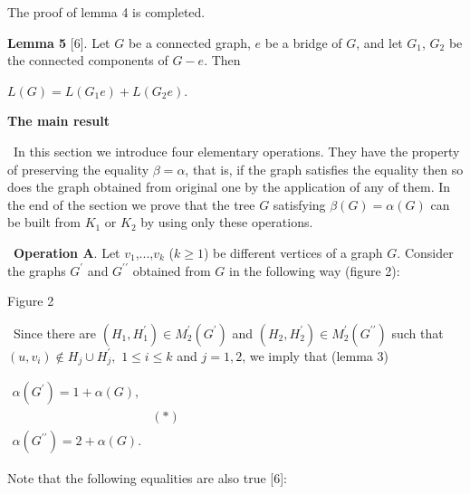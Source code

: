 \documentclass{article}
\begin{document}
The proof of lemma 4 is completed.

\textbf{Lemma 5 }[6]. Let $G$ be a connected graph, $e$ be a bridge of $G$,
and let $G_{1}$, $G_{2}$ be the connected components of $G-e$. Then

\begin{center}
$L(G)=L(G_{1}e)+L(G_{2}e)$.
\end{center}

\bigskip

\begin{center}
\textbf{The main result}
\end{center}

\bigskip

\ In this section we introduce four elementary operations. They have the
property of preserving the equality $\beta =\alpha $, that is, if the graph
satisfies the equality then so does the graph obtained from original one by
the application of any of them. In the end of the section we prove that the
tree $G$ satisfying $\beta (G)=\alpha (G)$ can be built from $K_{1}$ or $K_{2}$ by using only these operations.

\bigskip

\ \textbf{Operation A}. Let $v_{1}$,...,$v_{k}$ ($k\geq 1$) be different
vertices of a graph $G$. Consider the graphs $G^{\prime }$ and $G^{\prime
\prime }$ obtained from $G$ in the following way (figure 2):

\begin{center}

Figure 2\bigskip
\end{center}

\ Since there are $(H_{1},H_{1}^{\prime })\in M_{2}^{\prime }(G^{\prime })$
and $(H_{2},H_{2}^{\prime })\in M_{2}^{\prime }(G^{\prime \prime })$ such
that $(u,v_{i})\notin H_{j}\cup H_{j}^{\prime },$ $1\leq i\leq k$ and $j=1,2 
$, we imply that (lemma 3)

\begin{center}
$\begin{array}{cc}
\alpha (G^{\prime })=1+\alpha (G), &  \\ 
& (\ast ) \\ 
\alpha (G^{\prime \prime })=2+\alpha (G). & 
\end{array}$
\end{center}

Note that the following equalities are also true [6]:
\end{document}
